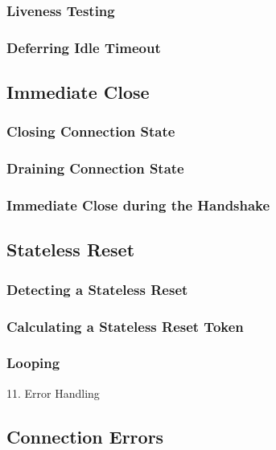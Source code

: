 \documentclass{article}
\begin{document}
\subsubsection{Liveness Testing}

\subsubsection{Deferring Idle Timeout}

\subsection{Immediate Close}

\subsubsection{Closing Connection State}

\subsubsection{Draining Connection State}

\subsubsection{Immediate Close during the Handshake}

\subsection{Stateless Reset}

\subsubsection{Detecting a Stateless Reset}

\subsubsection{Calculating a Stateless Reset Token}

\subsubsection{Looping}

11. Error Handling

\subsection{Connection Errors}
\end{document}
